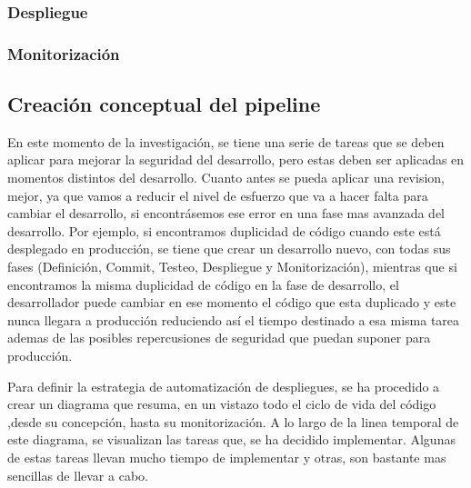 \documentclass[12pt]{report} %
\begin{document}
\subsubsection{Despliegue}
\subsubsection{Monitorización}

\subsection{Creación conceptual del pipeline}

En este momento de la investigación, se tiene una serie de tareas que se deben
aplicar para mejorar la seguridad del desarrollo, pero estas deben ser aplicadas
en momentos distintos del desarrollo. 
Cuanto antes se pueda aplicar una revision, mejor, ya que vamos a reducir el
nivel de esfuerzo que va a hacer falta para cambiar el desarrollo, si
encontrásemos ese error en una fase mas avanzada del desarrollo.
Por ejemplo, si encontramos duplicidad de código cuando este está
desplegado en producción, se tiene que crear un desarrollo nuevo, con todas sus
fases (Definición, Commit, Testeo, Despliegue y Monitorización), mientras que si
encontramos la misma duplicidad de código en la fase de desarrollo, el
desarrollador puede cambiar en ese momento el código que esta duplicado y este
nunca llegara a producción reduciendo así el tiempo destinado a esa misma tarea
ademas de las posibles repercusiones de seguridad que puedan suponer para
producción. 

Para definir la estrategia de automatización de despliegues, se ha procedido a
crear un diagrama que resuma, en un vistazo todo el ciclo de vida del código
,desde su concepción, hasta su monitorización.
A lo largo de la linea temporal de este diagrama, se visualizan las tareas que,
se ha decidido implementar.
Algunas de estas tareas llevan mucho tiempo de implementar y otras, son bastante
mas sencillas de llevar a cabo.
\end{document}
